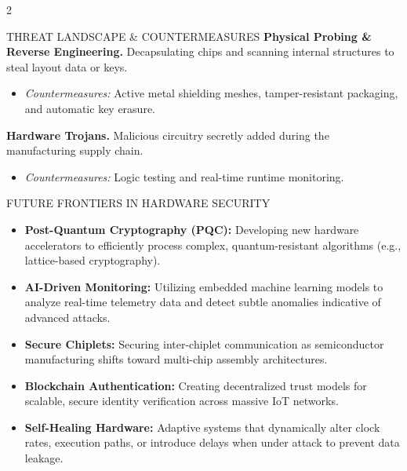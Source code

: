 \documentclass[10pt]{article}
\begin{document}
\begin{multicols}{2}
\begin{sectionbox}{THREAT LANDSCAPE \& COUNTERMEASURES}
\textbf{Physical Probing \& Reverse Engineering.}
Decapsulating chips and scanning internal structures to steal layout data or keys.
\begin{itemize}
\item \textit{Countermeasures:} Active metal shielding meshes, tamper-resistant packaging, and automatic key erasure.
\end{itemize}

\textbf{Hardware Trojans.}
Malicious circuitry secretly added during the manufacturing supply chain.
\begin{itemize}
\item \textit{Countermeasures:} Logic testing and real-time runtime monitoring.
\end{itemize}
\end{sectionbox}

\begin{sectionbox}{FUTURE FRONTIERS IN HARDWARE SECURITY}
\small
\begin{itemize}
\item \textbf{Post-Quantum Cryptography (PQC):} Developing new hardware accelerators to efficiently process complex, quantum-resistant algorithms (e.g., lattice-based cryptography).
\item \textbf{AI-Driven Monitoring:} Utilizing embedded machine learning models to analyze real-time telemetry data and detect subtle anomalies indicative of advanced attacks.
\item \textbf{Secure Chiplets:} Securing inter-chiplet communication as semiconductor manufacturing shifts toward multi-chip assembly architectures.
\item \textbf{Blockchain Authentication:} Creating decentralized trust models for scalable, secure identity verification across massive IoT networks.
\item \textbf{Self-Healing Hardware:} Adaptive systems that dynamically alter clock rates, execution paths, or introduce delays when under attack to prevent data leakage.
\end{itemize}
\end{sectionbox}


\end{multicols}
\end{document}
